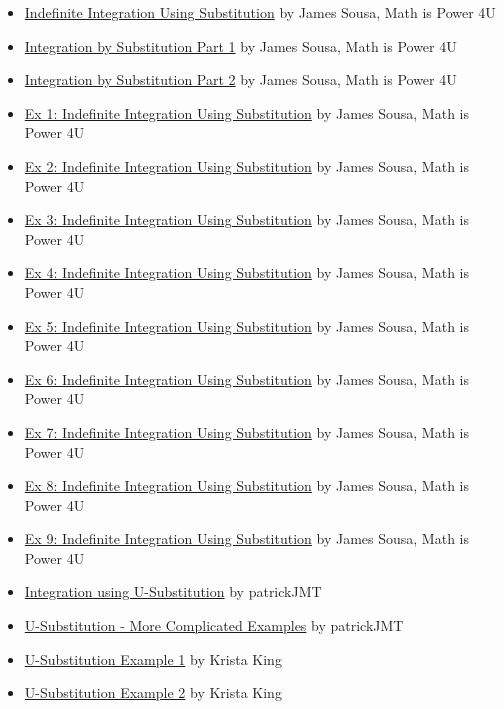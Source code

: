 \begin{itemize}
    \item \href{https://www.youtube.com/watch?v=568hUU4beuk}{Indefinite Integration Using Substitution} by James Sousa, Math is Power 4U
    \item \href{https://youtu.be/VfvJ5C9FjcA}{Integration by Substitution Part 1} by James Sousa, Math is Power 4U
    \item \href{https://youtu.be/pmekyFVIorE}{Integration by Substitution Part 2} by James Sousa, Math is Power 4U
    \item \href{https://www.youtube.com/watch?v=3MbdmYeYB_I}{Ex 1: Indefinite Integration Using Substitution} by James Sousa, Math is Power 4U
    \item \href{https://www.youtube.com/watch?v=xLtPL1Td5f4}{Ex 2: Indefinite Integration Using Substitution} by James Sousa, Math is Power 4U
    \item \href{https://www.youtube.com/watch?v=Cdk-3H35TrY}{Ex 3: Indefinite Integration Using Substitution} by James Sousa, Math is Power 4U
    \item \href{https://www.youtube.com/watch?v=hauyUjzRTos}{Ex 4: Indefinite Integration Using Substitution} by James Sousa, Math is Power 4U
    \item \href{https://www.youtube.com/watch?v=902ta0Kshoc}{Ex 5: Indefinite Integration Using Substitution} by James Sousa, Math is Power 4U
    \item \href{https://www.youtube.com/watch?v=FJHHQdQEecE}{Ex 6: Indefinite Integration Using Substitution} by James Sousa, Math is Power 4U
    \item \href{https://www.youtube.com/watch?v=VY5r1-9apdc}{Ex 7: Indefinite Integration Using Substitution} by James Sousa, Math is Power 4U
    \item \href{https://www.youtube.com/watch?v=UnND2S4IQSA}{Ex 8: Indefinite Integration Using Substitution} by James Sousa, Math is Power 4U
    \item \href{https://www.youtube.com/watch?v=CVfe5vNy4y4}{Ex 9: Indefinite Integration Using Substitution} by James Sousa, Math is Power 4U
    \item \href{https://youtu.be/qclrs-1rpKI}{Integration using U-Substitution} by patrickJMT
    \item \href{https://youtu.be/x06V9xuLdqg}{U-Substitution - More Complicated Examples} by patrickJMT
    \item \href{https://youtu.be/HHSepCzP56M}{U-Substitution Example 1} by Krista King
    \item \href{https://youtu.be/iRIhO-w46L0}{U-Substitution Example 2} by Krista King

\end{itemize}
